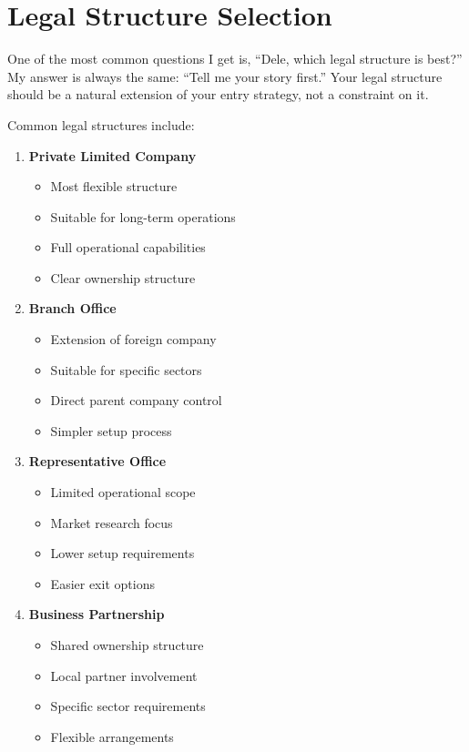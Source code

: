 \section{Legal Structure Selection}\label{sec:legal-structure-selection}

One of the most common questions I get is, ``Dele, which legal structure is best?'' My answer is always the same: ``Tell me your story first.'' Your legal structure should be a natural extension of your entry strategy, not a constraint on it.

Common legal structures include:
\begin{enumerate}
    \item \textbf{Private Limited Company}
    \begin{itemize}
        \item Most flexible structure
        \item Suitable for long-term operations
        \item Full operational capabilities
        \item Clear ownership structure
    \end{itemize}
    \item \textbf{Branch Office}
    \begin{itemize}
        \item Extension of foreign company
        \item Suitable for specific sectors
        \item Direct parent company control
        \item Simpler setup process
    \end{itemize}
    \item \textbf{Representative Office}
    \begin{itemize}
        \item Limited operational scope
        \item Market research focus
        \item Lower setup requirements
        \item Easier exit options
    \end{itemize}
    \item \textbf{Business Partnership}
    \begin{itemize}
        \item Shared ownership structure
        \item Local partner involvement
        \item Specific sector requirements
        \item Flexible arrangements
    \end{itemize}
\end{enumerate}

